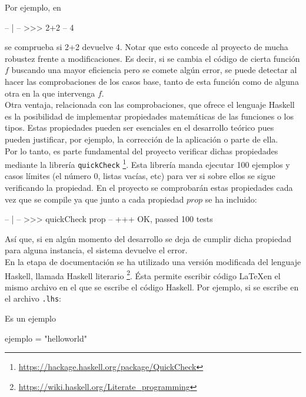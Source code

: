 \newpage

Por ejemplo, en

\begin{code}
-- | 
-- >>> 2+2
-- 4
\end{code}

se comprueba si 2+2 devuelve 4. Notar que esto concede al proyecto de mucha robustez frente a modificaciones. Es decir, si se cambia el código de cierta función $f$ buscando una mayor eficiencia pero se comete algún error, se puede detectar al hacer las comprobaciones de los casos base, tanto de esta función como de alguna otra en la que intervenga $f$.\\

Otra ventaja, relacionada con las comprobaciones, que ofrece el lenguaje Haskell es la posibilidad de implementar propiedades matemáticas de las funciones o los tipos. Estas propiedades pueden ser esenciales en el desarrollo teórico pues pueden justificar, por ejemplo, la corrección de la aplicación o parte de ella.\\

Por lo tanto, es parte fundamental del proyecto verificar dichas propiedades mediante la librería \texttt{quickCheck} \footnote{\url{https://hackage.haskell.org/package/QuickCheck}}. Esta librería manda ejecutar 100 ejemplos y casos límites (el número 0, listas vacías, etc) para ver si sobre ellos se sigue verificando la propiedad. En el proyecto se comprobarán estas propiedades cada vez que se compile ya que junto a cada propiedad $prop$ se ha incluido:

\begin{code}
-- | 
-- >>> quickCheck prop
--  +++ OK, passed 100 tests
\end{code}

Así que, si en algún momento del desarrollo se deja de cumplir dicha propiedad para alguna instancia, el sistema devuelve el error.\\

En la etapa de documentación se ha utilizado una versión modificada del lenguaje Haskell, llamada Haskell literario \footnote{\url{https://wiki.haskell.org/Literate_programming}}. Ésta permite escribir código \LaTeX en el mismo archivo en el que se escribe el código Haskell. Por ejemplo, si se escribe en el archivo \texttt{.lhs}:

\begin{codigo}
Es un ejemplo
\begin{code}
ejemplo = "helloworld"
\end{code}
\end{codigo}

